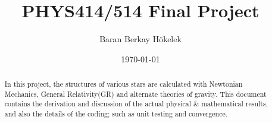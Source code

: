 \documentclass[aps,twocolumn,showpacs,preprintnumbers,nofootinbib,prl,superscriptaddress,groupedaddress]{revtex4-2}
\begin{document}
\title{PHYS414/514 Final Project}
\author{Baran Berkay H\"okelek} %
\date{\today}

\begin{abstract}
In this project, the structures of various stars are calculated with Newtonian Mechanics, General Relativity(GR) and alternate theories of gravity. This document contains the derivation and discussion of the actual physical \& mathematical results, and also the details of the coding; such as unit testing and convergence. 
\end{abstract}
\maketitle


\end{document}
